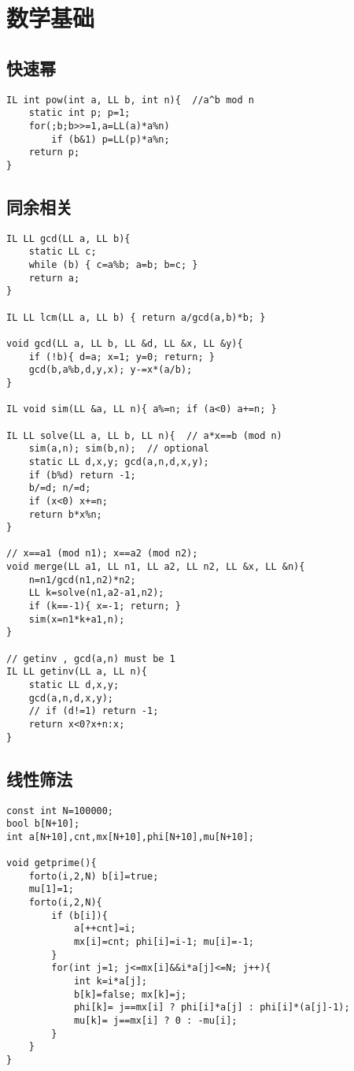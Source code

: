 \documentclass{article}
\begin{document}
\section{数学基础}

\subsection{快速幂}
\begin{lstlisting}
IL int pow(int a, LL b, int n){  //a^b mod n
	static int p; p=1;
	for(;b;b>>=1,a=LL(a)*a%n)
		if (b&1) p=LL(p)*a%n;
    return p;
}
\end{lstlisting}

\subsection{同余相关}
\begin{lstlisting}
IL LL gcd(LL a, LL b){
	static LL c;
	while (b) { c=a%b; a=b; b=c; }
	return a;
}

IL LL lcm(LL a, LL b) { return a/gcd(a,b)*b; }

void gcd(LL a, LL b, LL &d, LL &x, LL &y){
	if (!b){ d=a; x=1; y=0; return; }
	gcd(b,a%b,d,y,x); y-=x*(a/b);
}

IL void sim(LL &a, LL n){ a%=n; if (a<0) a+=n; }

IL LL solve(LL a, LL b, LL n){  // a*x==b (mod n)
	sim(a,n); sim(b,n);  // optional
	static LL d,x,y; gcd(a,n,d,x,y);
	if (b%d) return -1;
	b/=d; n/=d;
	if (x<0) x+=n;
	return b*x%n;
}

// x==a1 (mod n1); x==a2 (mod n2);
void merge(LL a1, LL n1, LL a2, LL n2, LL &x, LL &n){
	n=n1/gcd(n1,n2)*n2;
	LL k=solve(n1,a2-a1,n2);	
	if (k==-1){ x=-1; return; }
	sim(x=n1*k+a1,n);
}

// getinv , gcd(a,n) must be 1
IL LL getinv(LL a, LL n){
	static LL d,x,y;
	gcd(a,n,d,x,y);
	// if (d!=1) return -1;
	return x<0?x+n:x;
}
\end{lstlisting}

\subsection{线性筛法}
\begin{lstlisting}
const int N=100000;
bool b[N+10];
int a[N+10],cnt,mx[N+10],phi[N+10],mu[N+10];

void getprime(){
	forto(i,2,N) b[i]=true;
	mu[1]=1;
	forto(i,2,N){
		if (b[i]){
			a[++cnt]=i;
			mx[i]=cnt; phi[i]=i-1; mu[i]=-1;
		}
		for(int j=1; j<=mx[i]&&i*a[j]<=N; j++){
			int k=i*a[j];
			b[k]=false; mx[k]=j;
			phi[k]= j==mx[i] ? phi[i]*a[j] : phi[i]*(a[j]-1);
			mu[k]= j==mx[i] ? 0 : -mu[i];
		}
	}
}
\end{lstlisting}
\end{document}
